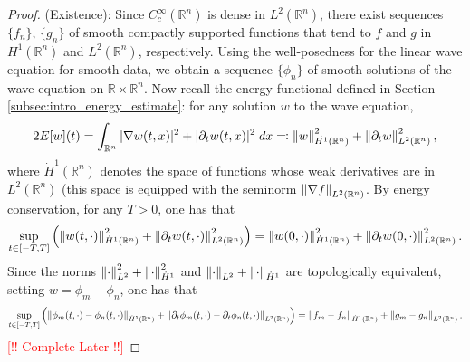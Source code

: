 \documentclass{article}
\numberwithin{equation}{section}
\begin{document}
	\begin{proof}
		(Existence): Since $C_{c}^{\infty}(\mathbb{R}^{n})$ is dense in $L^{2}(\mathbb{R}^{n})$, there exist sequences $\{f_{n}\}$, $\{g_{n}\}$ of smooth compactly supported functions that tend to $f$ and $g$ in $H^{1}(\mathbb{R}^{n})$ and $L^{2}(\mathbb{R}^{n})$, respectively. Using the well-posedness for the linear wave equation for smooth data, we obtain a sequence $\{\phi_{n}\}$ of smooth solutions of the wave equation on $\mathbb{R} \times \mathbb{R}^{n}$. Now recall the energy functional defined in Section \ref{subsec:intro_energy_estimate}: for any solution $w$ to the wave equation, 
		\begin{equation*}
			2E[w](t) = \int_{\mathbb{R}^{n}}|\nabla w(t,x)|^{2} + |\partial_{t}w(t,x)|^{2}\;dx \eqqcolon \left\Vert w \right\Vert_{\dot{H^{1}}(\mathbb{R}^{n})}^{2}+  \left\Vert \partial_{t}w \right\Vert_{L^{2}(\mathbb{R}^{n})}^{2}, 
		\end{equation*}
		where $\dot{H}^{1}(\mathbb{R}^{n})$ denotes the space of functions whose weak derivatives are in $L^{2}(\mathbb{R}^{n})$ (this space is equipped with the seminorm $\left\Vert \nabla f \right\Vert_{L^{2}(\mathbb{R}^{n})}$. By energy conservation, for any $T > 0$, one has that 
		\begin{equation*}
			\sup_{t \in [-T,T]}\left(\left\Vert w(t, \cdot) \right\Vert^{2}_{\dot{H}^{1}(\mathbb{R}^{n})} + \left\Vert \partial_{t}w(t,\cdot) \right\Vert_{L^{2}(\mathbb{R}^{n})}^{2}\right) = \left\Vert w(0,\cdot) \right\Vert_{\dot{H}^{1}(\mathbb{R}^{n})}^{2} + \left\Vert \partial_{t}w(0,\cdot) \right\Vert_{L^{2}(\mathbb{R}^{n})}^{2}. 
		\end{equation*}
		Since the norms $\left\Vert \cdot \right\Vert_{L^{2}}^{2} + \left\Vert \cdot \right\Vert_{\dot{H}^{1}}^{2}$ and $\left\Vert \cdot \right\Vert_{L^2} + \left\Vert \cdot \right\Vert_{\dot{H}^{1}}$ are topologically equivalent, setting $w = \phi_{m} - \phi_{n}$, one has that 
		\begin{equation*}
			\sup_{t \in [-T,T]}\left(\left\Vert \phi_{m}(t, \cdot) - \phi_{n}(t, \cdot) \right\Vert_{\dot{H}^{1}(\mathbb{R}^{n})} + \left\Vert \partial_{t}\phi_{m}(t, \cdot) - \partial_{t}\phi_{n}(t, \cdot) \right\Vert_{L^{2}(\mathbb{R}^{n})}\right) = \left\Vert f_{m} - f_{n} \right\Vert_{\dot{H}^{1}(\mathbb{R}^{n})} + \left\Vert g_{m} - g_{n} \right\Vert_{L^{2}(\mathbb{R}^{n})}. 
		\end{equation*}
		\textcolor{red}{[!! Complete Later !!]}
	\end{proof}
	
\end{document}
